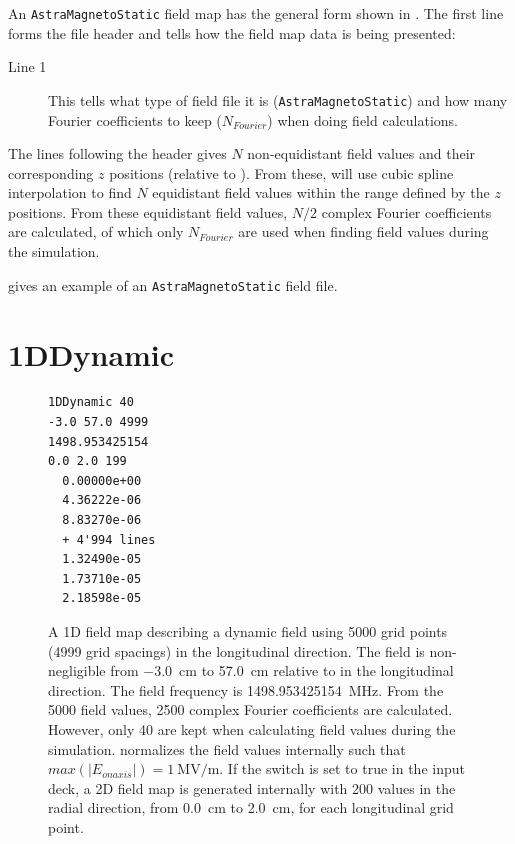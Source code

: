 An \texttt{AstraMagnetoStatic} field map has the general form shown in . The first line forms
the file header and tells \opalt how the field map data is being presented:

\begin{description}
\item[Line 1] This tells \opalt what type of field file it is (\texttt{AstraMagnetoStatic}) and how many Fourier coefficients to
  keep ($N_{Fourier}$) when doing field calculations.
\end{description}

The lines following the header gives $N$ non-equidistant field values and their corresponding $z$ positions (relative
to ). From these, \opalt will use cubic spline interpolation to find $N$ equidistant field values
within the range defined by the $z$ positions. From these equidistant field values, $N/2$ complex Fourier coefficients
are calculated, of which only $N_{Fourier}$ are used when finding field values during the simulation.

 gives an example of an \texttt{AstraMagnetoStatic} field file.


\section{1DDynamic}
\label{sec:1DDynamic}
\begin{figure}[h]
  \begin{fmpage}
\begin{verbatim}
1DDynamic 40
-3.0 57.0 4999
1498.953425154
0.0 2.0 199
  0.00000e+00
  4.36222e-06
  8.83270e-06
  + 4'994 lines
  1.32490e-05
  1.73710e-05
  2.18598e-05
\end{verbatim}
  \end{fmpage}
  \caption[Example of a 1DDynamic field map]{A 1D field map describing a dynamic field using 5000 grid points (4999 grid
    spacings) in the longitudinal direction. The field is non-negligible from \SI{-3.0}{\centi\meter} to \SI{57.0}{\centi\meter} relative to 
    in the longitudinal direction. The field frequency is \SI{1498.953425154}{\mega\hertz}. From the 5000 field values, 2500 complex
    Fourier coefficients are calculated. However, only 40 are kept when calculating field values during the simulation.
    \opalt normalizes the field values internally such that $max(|E_{on axis}|) = \SI{1}{\mega\volt/\meter}$. If the  switch is set to true
    in the input deck, a 2D field map is generated internally with 200 values in the radial direction, from \SI{0.0}{\centi\meter} to
    \SI{2.0}{\centi\meter}, for each longitudinal grid point.}
  \label{fig:1DDynamic}
\end{figure}

